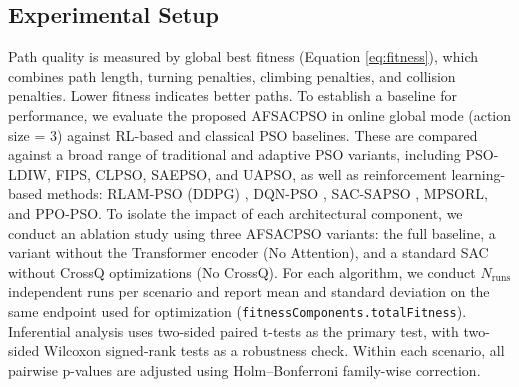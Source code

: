 \documentclass[final,5p,times]{elsarticle}
\newcommand{\symNumruns}{N_{\text{runs}}}
\begin{document}
\label{sec:results} \subsection{Experimental Setup} Path quality is measured by global best fitness (Equation \ref{eq:fitness}), which combines path length, turning penalties, climbing penalties, and collision penalties.
Lower fitness indicates better paths. To establish a baseline for performance, we evaluate the proposed AFSACPSO in online global mode (action size = 3) against RL-based and classical PSO baselines.
These are compared against a broad range of traditional and adaptive PSO variants, including PSO-LDIW, FIPS, CLPSO, SAEPSO, and UAPSO, as well as reinforcement learning-based methods: RLAM-PSO (DDPG) \cite{Yin2023RLAMPSO}, DQN-PSO \cite{Aoun2024Deep}, SAC-SAPSO \cite{vonEschwege2024Soft}, MPSORL, and PPO-PSO.
To isolate the impact of each architectural component, we conduct an ablation study using three AFSACPSO variants: the full baseline, a variant without the Transformer encoder (No Attention), and a standard SAC without CrossQ optimizations (No CrossQ).
For each algorithm, we conduct $\symNumruns$ independent runs per scenario and report mean and standard deviation on the same endpoint used for optimization (\texttt{fitnessComponents.totalFitness}).
Inferential analysis uses two-sided paired t-tests as the primary test, with two-sided Wilcoxon signed-rank tests as a robustness check.
Within each scenario, all pairwise p-values are adjusted using Holm--Bonferroni family-wise correction.
\end{document}
